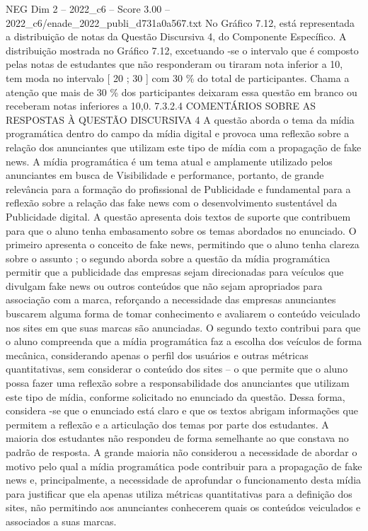 \begin{textsample}{NEG Dim 2 – 2022\_c6 – Score 3.00 – 2022\_c6/enade\_2022\_publi\_d731a0a567.txt}
No Gráfico 7.12, está representada a distribuição de notas da Questão Discursiva 4, do Componente Específico.
A distribuição mostrada no Gráfico 7.12, excetuando -se o intervalo que é composto pelas notas de estudantes que não responderam ou tiraram nota inferior a 10, tem moda no intervalo [ 20 ; 30 ] com 30 \% do total de participantes.
Chama a atenção que mais de 30 \% dos participantes deixaram essa questão em branco ou receberam notas inferiores a 10,0. 7.3.2.4 COMENTÁRIOS SOBRE AS RESPOSTAS À QUESTÃO DISCURSIVA 4 A questão aborda o tema da mídia programática dentro do campo da mídia digital e provoca uma reflexão sobre a relação dos anunciantes que utilizam este tipo de mídia com a propagação de fake news.
A mídia programática é um tema atual e amplamente utilizado pelos anunciantes em busca de Visibilidade e performance, portanto, de grande relevância para a formação do profissional de Publicidade e fundamental para a reflexão sobre a relação das fake news com o desenvolvimento sustentável da Publicidade digital.
A questão apresenta dois textos de suporte que contribuem para que o aluno tenha embasamento sobre os temas abordados no enunciado.
O primeiro apresenta o conceito de fake news, permitindo que o aluno tenha clareza sobre o assunto ; o segundo aborda sobre a questão da mídia programática permitir que a publicidade das empresas sejam direcionadas para veículos que divulgam fake news ou outros conteúdos que não sejam apropriados para associação com a marca, reforçando a necessidade das empresas anunciantes buscarem alguma forma de tomar conhecimento e avaliarem o conteúdo veiculado nos sites em que suas marcas são anunciadas.
O segundo texto contribui para que o aluno compreenda que a mídia programática faz a escolha dos veículos de forma mecânica, considerando apenas o perfil dos usuários e outras métricas quantitativas, sem considerar o conteúdo dos sites – o que permite que o aluno possa fazer uma reflexão sobre a responsabilidade dos anunciantes que utilizam este tipo de mídia, conforme solicitado no enunciado da questão.
Dessa forma, considera -se que o enunciado está claro e que os textos abrigam informações que permitem a reflexão e a articulação dos temas por parte dos estudantes.
A maioria dos estudantes não respondeu de forma semelhante ao que constava no padrão de resposta.
A grande maioria não considerou a necessidade de abordar o motivo pelo qual a mídia programática pode contribuir para a propagação de fake news e, principalmente, a necessidade de aprofundar o funcionamento desta mídia para justificar que ela apenas utiliza métricas quantitativas para a definição dos sites, não permitindo aos anunciantes conhecerem quais os conteúdos veiculados e associados a suas marcas.

\end{textsample}
